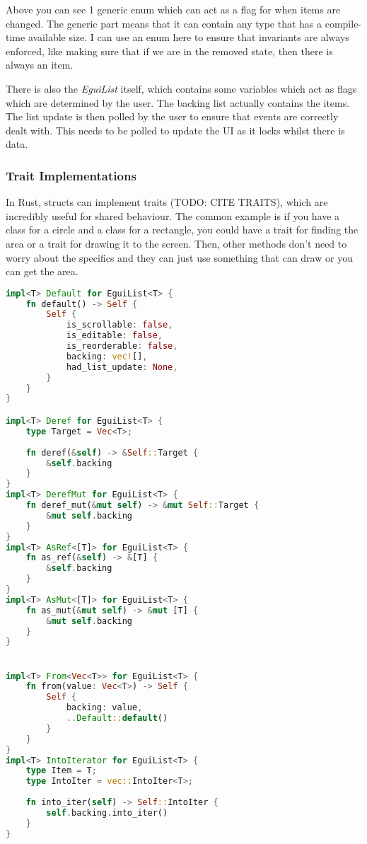 \documentclass{article}
\begin{document}
Above you can see 1 generic enum which can act as a flag for when items are changed. The generic part means that it can contain any type that has a compile-time available size. I can use an enum here to ensure that invariants are always enforced, like making sure that if we are in the removed state, then there is always an item.

There is also the \textit{EguiList} itself, which contains some variables which act as flags which are determined by the user. The backing list actually contains the items. The list update is then polled by the user to ensure that events are correctly dealt with. This needs to be polled to update the UI as it locks whilst there is data.

\subsubsection{Trait Implementations}

In Rust, structs can implement traits (TODO: CITE TRAITS), which are incredibly useful for shared behaviour. The common example is if you have a class for a circle and a class for a rectangle, you could have a trait for finding the area or a trait for drawing it to the screen. Then, other methods don't need to worry about the specifics and they can just use something that can draw or you can get the area.

\begin{lstlisting}[language=Rust]
impl<T> Default for EguiList<T> {
	fn default() -> Self {
		Self {
			is_scrollable: false,
			is_editable: false,
			is_reorderable: false,
			backing: vec![],
			had_list_update: None,
		}
	}
}

impl<T> Deref for EguiList<T> {
	type Target = Vec<T>;
	
	fn deref(&self) -> &Self::Target {
		&self.backing
	}
}
impl<T> DerefMut for EguiList<T> {
	fn deref_mut(&mut self) -> &mut Self::Target {
		&mut self.backing
	}
}
impl<T> AsRef<[T]> for EguiList<T> {
	fn as_ref(&self) -> &[T] {
		&self.backing
	}
}
impl<T> AsMut<[T]> for EguiList<T> {
	fn as_mut(&mut self) -> &mut [T] {
		&mut self.backing
	}
}


impl<T> From<Vec<T>> for EguiList<T> {
	fn from(value: Vec<T>) -> Self {
		Self {
			backing: value,
			..Default::default()
		}
	}
}
impl<T> IntoIterator for EguiList<T> {
	type Item = T;
	type IntoIter = vec::IntoIter<T>;
	
	fn into_iter(self) -> Self::IntoIter {
		self.backing.into_iter()
	}
}
\end{lstlisting}
\end{document}
